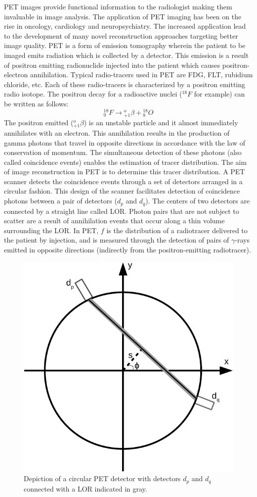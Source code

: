 \ac{PET} images provide functional information to the radiologist making them invaluable in image analysis. The application of \ac{PET} imaging has been on the rise in oncology, cardiology and neuropsychiatry. The increased application lead to the development of many novel reconstruction approaches targeting better image quality. \ac{PET} is a form of emission tomography wherein the patient to be imaged emits radiation which is collected by a detector. This emission is a result of positron emitting radionuclide injected into the patient which causes positron-electron annihilation. Typical radio-tracers used in \ac{PET} are \ac{FDG}, \ac{FLT}, rubidium chloride, etc. Each of these radio-tracers is characterized by a positron emitting radio isotope. The positron decay for a radioactive nuclei (${ }_{}^{18} F$ for example) can be written as follows:
$$
{ }_{9}^{18} F \rightarrow{ }_{+1}^{o} \beta+{ }_{8}^{18} O
$$
The positron emitted (${ }_{+1}^{o} \beta$) is an unstable particle and it almost immediately annihilates with an electron. This annihilation results in the production of gamma photons that travel in opposite directions in accordance with the law of conservation of momentum. The simultaneous detection of these photons (also called coincidence events) enables the estimation of tracer distribution. The aim of image reconstruction in \ac{PET} is to determine this tracer distribution. A \ac{PET} scanner detects the coincidence events through a set of detectors arranged in a circular fashion. This design of the scanner facilitates detection of coincidence photons between a pair of detectors ($d_p$ and $d_q$). The centers of two detectors are connected by a straight line called \ac{LOR}. Photon pairs that are not subject to scatter are a result of annihilation events that occur along a thin volume surrounding the \ac{LOR}. In \ac{PET}, $f$ is the distribution of a radiotracer delivered to the patient by injection, and is measured through the detection of pairs of $\gamma$-rays emitted in opposite directions (indirectly from the positron-emitting radiotracer). 

\begin{figure}[!htbp]
	\centering
	\includegraphics[width=0.6\linewidth]{./Figures/PET_det-crop.pdf}
	\caption{Depiction of a circular \ac{PET} detector with detectors $d_p$ and $d_q$ connected with a \ac{LOR} indicated in gray.}
	\label{fig:2dpet}
\end{figure}

